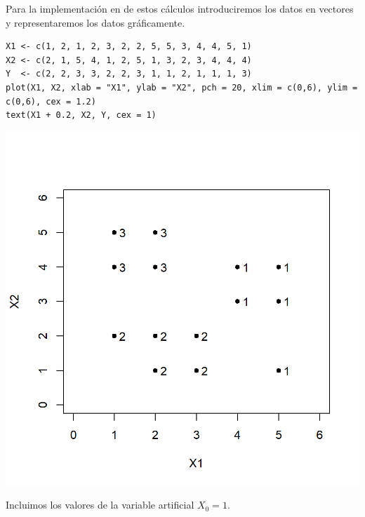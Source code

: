 Para la implementación en  de estos cálculos introduciremos los datos en vectores y representaremos los datos gráficamente.

\begin{lstlisting}
X1 <- c(1, 2, 1, 2, 3, 2, 2, 5, 5, 3, 4, 4, 5, 1)
X2 <- c(2, 1, 5, 4, 1, 2, 5, 1, 3, 2, 3, 4, 4, 4)
Y  <- c(2, 2, 3, 3, 2, 2, 3, 1, 1, 2, 1, 1, 1, 3)
plot(X1, X2, xlab = "X1", ylab = "X2", pch = 20, xlim = c(0,6), ylim = c(0,6), cex = 1.2)
text(X1 + 0.2, X2, Y, cex = 1)
\end{lstlisting}
\begin{center}
	\includegraphics[width=0.5\linewidth]{"Temas/Imágenes/Tema 3/screenshot009"}
\end{center}
Incluimos los valores de la variable artificial $X_0=1$.

